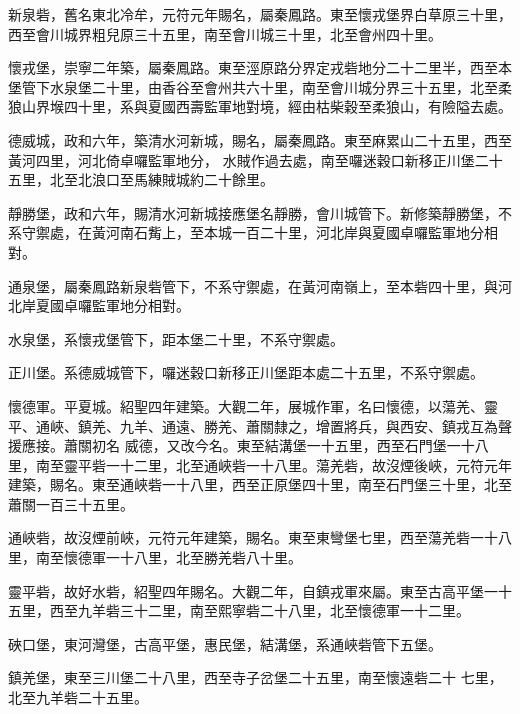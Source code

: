 \begin{pinyinscope}
 新泉砦，舊名東北冷牟，元符元年賜名，屬秦鳳路。東至懷戎堡界白草原三十里，西至會川城界粗兒原三十五里，南至會川城三十里，北至會州四十里。



 懷戎堡，崇寧二年築，屬秦鳳路。東至涇原路分界定戎砦地分二十二里半，西至本堡管下水泉堡二十里，由香谷至會州共六十里，南至會川城分界三十五里，北至柔狼山界堠四十里，系與夏國西壽監軍地對境，經由枯柴穀至柔狼山，有險隘去處。



 德威城，政和六年，築清水河新城，賜名，屬秦鳳路。東至麻累山二十五里，西至黃河四里，河北倚卓囉監軍地分，
 水賊作過去處，南至囉迷穀口新移正川堡二十五里，北至北浪口至馬練賊城約二十餘里。



 靜勝堡，政和六年，賜清水河新城接應堡名靜勝，會川城管下。新修築靜勝堡，不系守禦處，在黃河南石觜上，至本城一百二十里，河北岸與夏國卓囉監軍地分相對。



 通泉堡，屬秦鳳路新泉砦管下，不系守禦處，在黃河南嶺上，至本砦四十里，與河北岸夏國卓囉監軍地分相對。



 水泉堡，系懷戎堡管下，距本堡二十里，不系守禦處。



 正川堡。系德威城管下，囉迷穀口新移正川堡距本處二十五里，不系守禦處。



 懷德軍。平夏城。紹聖四年建築。大觀二年，展城作軍，名曰懷德，以蕩羌、靈平、通峽、鎮羌、九羊、通遠、勝羌、蕭關隸之，增置將兵，與西安、鎮戎互為聲援應接。蕭關初名
 威德，又改今名。東至結溝堡一十五里，西至石門堡一十八里，南至靈平砦一十二里，北至通峽砦一十八里。蕩羌砦，故沒煙後峽，元符元年建築，賜名。東至通峽砦一十八里，西至正原堡四十里，南至石門堡三十里，北至蕭關一百三十五里。



 通峽砦，故沒煙前峽，元符元年建築，賜名。東至東彎堡七里，西至蕩羌砦一十八里，南至懷德軍一十八里，北至勝羌砦八十里。



 靈平砦，故好水砦，紹聖四年賜名。大觀二年，自鎮戎軍來屬。東至古高平堡一十五里，西至九羊砦三十二里，南至熙寧砦二十八里，北至懷德軍一十二里。



 硤口堡，東河灣堡，古高平堡，惠民堡，結溝堡，系通峽砦管下五堡。



 鎮羌堡，東至三川堡二十八里，西至寺子岔堡二十五里，南至懷遠砦二十
 七里，北至九羊砦二十五里。




\end{pinyinscope}
